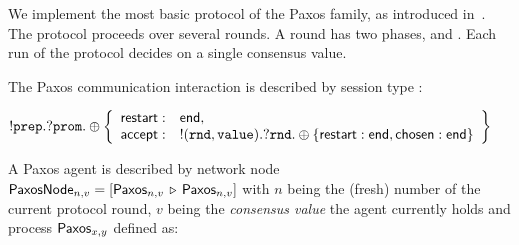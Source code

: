 We implement the most basic protocol of the Paxos family, as introduced in~\cite{lamport2001paxos}.
The protocol proceeds over several rounds. A round has two phases, \PreparePh and \AcceptPh. Each run of the protocol decides on a single consensus value.

%

The Paxos communication interaction is described by session type \PaxosType:

$
		{}!\mathtt{prep}. {}?\mathtt{prom}.
			\oplus \left\{
			\begin{array}{rl}
				\mathsf{restart}: & \mathsf{end},
				\\[0mm]
				\mathsf{accept}: & {}!(\mathtt{rnd}, \mathtt{value}). {}?\mathtt{rnd}. \oplus \{ \mathsf{restart}: \mathsf{end}, \mathsf{chosen}: \mathsf{end} \}
			\end{array}
			\right\}
$

%
A Paxos agent is described by network node
$\mathsf{PaxosNode}_{n, v} = [\mathsf{Paxos}_{n, v} \,\triangleright\, \mathsf{Paxos}_{n, v}]$
with $n$ being the (fresh) number of the current protocol round, $v$
being the {\em consensus value} the agent currently holds and
process $\mathsf{Paxos}_{x, y}$ defined as:

